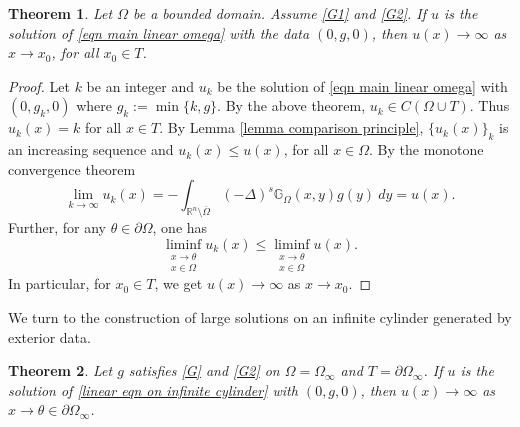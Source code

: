 \documentclass{amsart}
\newtheorem{theorem}{Theorem}[section]
\newcommand{\R}{\mathbb{R}}
\newcommand{\slap}{(-\Delta)^{s}}
\newcommand{\gk}[1]{\mathbb{G}_{#1}}
\begin{document}
\begin{theorem}\label{thrm blow up of solution where g is}
    Let $\Omega$ be a bounded domain. Assume  \ref{G1} and \ref{G2}. 
    If $u$ is the solution of \eqref{eqn main linear omega} with the data $(0,g,0)$, then $u(x)\to \infty$ as $x\to x_{0}$, for all $x_{0}\in T$.
\end{theorem}
\begin{proof}
    Let $k$ be an integer and $u_{k}$ be the solution of \eqref{eqn main linear omega} with $(0,g_{k},0)$ where $g_{k}:=\min\{k,g\}$. By the above theorem, $u_{k}\in C(\Omega\cup T)$. Thus $u_{k}(x)=k$ for all $x\in T$. By Lemma \ref{lemma comparison principle}, $\{u_{k}(x)\}_{k}$ is an increasing sequence and $u_{k}(x)\leq u(x)$, for all $x\in \Omega$. By the monotone convergence theorem 
    \begin{equation*}
        \lim_{k\to \infty}u_{k}(x)=-\int_{\R^{n}\setminus\overline{\Omega}}\slap\gk{\Omega}(x,y) g(y)\ dy= u(x).
    \end{equation*}
    Further, for any $\theta\in \partial\Omega$, one has
    \begin{equation*}
        \liminf_{\substack {x\to \theta\\ x\in \Omega}} u_{k}(x)\leq \liminf_{\substack{x\to \theta\\ x\in \Omega}} u(x).
    \end{equation*}
    In particular, for $x_{0}\in T$, we get $u(x)\to \infty$ as $x\to x_{0}$.
\end{proof}
We turn to the construction of large solutions on an infinite cylinder generated by exterior data.
\begin{theorem}
    Let $g$ satisfies \ref{G} and \ref{G2} on $\Omega=\Omega_{\infty}$ and $T=\partial\Omega_{\infty}$. If $u$ is the solution of \eqref{linear eqn on infinite cylinder} with $(0,g,0)$, then $u(x)\to \infty$ as $x\to \theta\in \partial\Omega_{\infty}$. 
\end{theorem}
\end{document}

